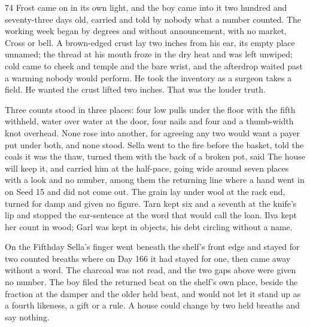
\scenebreak


\scenebreak


\scenebreak

\CRtailpiece
\begin{CRchronicle}{74}
Frost came on in its own light, and the boy came into it two hundred and seventy-three days old, carried and told by nobody what a number counted. The working week began by degrees and without announcement, with no market, Cross or bell. A brown-edged crust lay two inches from his ear, its empty place unnamed; the thread at his mouth froze in the dry heat and was left unwiped; cold came to cheek and temple and the bare wrist, and the afterdrop waited past a warming nobody would perform. He took the inventory as a surgeon takes a field. He wanted the crust lifted two inches. That was the louder truth.

Three counts stood in three places: four low pulls under the floor with the fifth withheld, water over water at the door, four nails and four and a thumb-width knot overhead. None rose into another, for agreeing any two would want a payer put under both, and none stood. Sella went to the fire before the basket, told the coals it was the thaw, turned them with the back of a broken pot, said The house will keep it, and carried him at the half-pace, going wide around seven places with a look and no number, among them the returning line where a hand went in on Seed 15 and did not come out. The grain lay under wool at the rack end, turned for damp and given no figure. Tarn kept six and a seventh at the knife’s lip and stopped the ear-sentence at the word that would call the loan. Ilva kept her count in wood; Garl was kept in objects, his debt circling without a name.

On the Fifthday Sella’s finger went beneath the shelf’s front edge and stayed for two counted breaths where on Day 166 it had stayed for one, then came away without a word. The charcoal was not read, and the two gaps above were given no number. The boy filed the returned beat on the shelf’s own place, beside the fraction at the damper and the older held beat, and would not let it stand up as a fourth likeness, a gift or a rule. A house could change by two held breaths and say nothing.


\end{CRchronicle}
